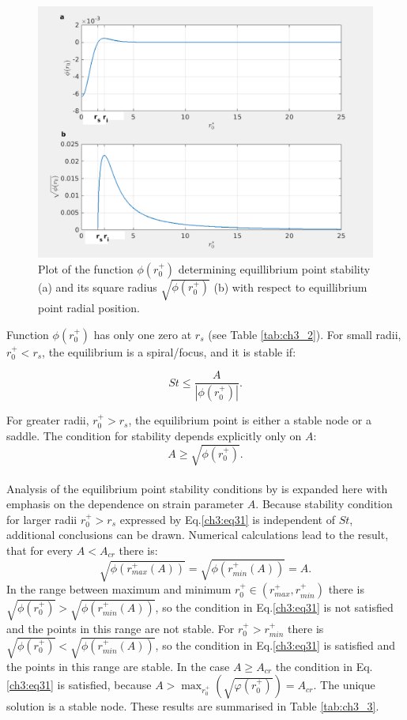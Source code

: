 \documentclass[../main.tex]{subfiles}
\begin{document}
\begin{figure}
\centering
\noindent \includegraphics[width=30pc]{gfx/stability_functions.png}
\caption{Plot of the function $\phi(r^+_0)$ determining equillibrium point stability (a) and its square radius $\sqrt{\phi(r^+_0)}$ (b) with respect to equillibrium point radial position.}
\label{fig:ch3_7}
\end{figure}

Function $\phi(r^+_0)$ has only one zero at $r_s$ (see Table \ref{tab:ch3_2}). For small radii, $r^+_0<r_s$, the equilibrium is a spiral/focus, and it is stable if:

\begin{equation}
St \leq \frac{A}{|{\phi(r^+_0)}|}.
\label{ch3:eq30}
\end{equation}

\noindent For greater radii, $r^+_0>r_s$, the equilibrium point is either a stable node or a saddle. The condition for stability depends explicitly only on $A$:
\begin{equation}
A \geq \sqrt{\phi(r^+_0)}.
\label{ch3:eq31}
\end{equation}
\\
Analysis of the equilibrium point stability conditions by \citet{Marcu1995} is expanded here with emphasis on the dependence on strain parameter $A$.  Because stability condition for larger radii $r^+_0 > r_s$ expressed by Eq.\ref{ch3:eq31} is independent of $St$, additional conclusions can be drawn. Numerical calculations lead to the result, that for every $A<A_{cr}$ there is:
\begin{equation}
\sqrt{\phi(r^+_{max}(A))}=\sqrt{\phi(r^+_{min}(A))}=A.
\label{ch3:eq32}
\end{equation}
In the range between maximum and minimum $r^+_0 \in (r^+_{max},r^+_{min})$ there is $\sqrt{\phi(r^+_0)} > \sqrt{\phi(r^+_{min}(A))}$, so the condition in Eq.\ref{ch3:eq31} is not satisfied and the points in this range are not stable. For $r^+_0 >r^+_{min}$ there is 
$\sqrt{\phi(r^+_0)} <\sqrt{\phi(r^+_{min}(A))}$, so the condition in Eq.\ref{ch3:eq31} is satisfied and the points in this range are stable.
In the case $A \geq A_{cr}$ the condition in Eq.\ref{ch3:eq31} is satisfied, because $A>\max_{r^+_0}\left( \sqrt{\varphi(r^+_0)}\right)=A_{cr}$. The unique solution is a stable node. These results are summarised in Table \ref{tab:ch3_3}.
\end{document}
